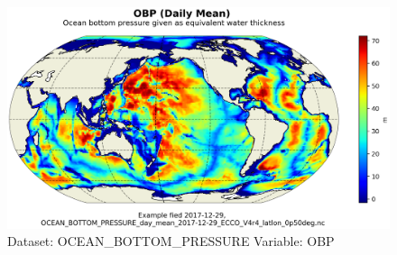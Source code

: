 \begin{figure}[H]
\centering
\includegraphics[scale=0.55]{../images/plots/latlon_plots/Ocean_Bottom_Pressure/OBP.png}
\caption{Dataset: OCEAN\_BOTTOM\_PRESSURE Variable: OBP}
\label{tab:table-OCEAN_BOTTOM_PRESSURE_OBP-Plot}
\end{figure}
\pagebreak
